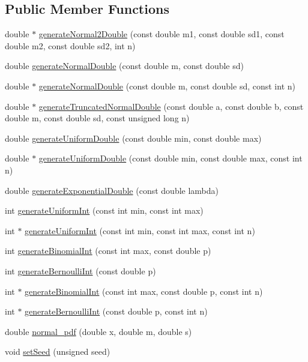 \subsection*{Public Member Functions}
\begin{DoxyCompactItemize}
\item 
double $\ast$ \mbox{\hyperlink{class_random_number_generator_a6a8cdbfdb3343a10aab18b83fc6ce0dc}{generate\+Normal2\+Double}} (const double m1, const double sd1, const double m2, const double sd2, int n)
\item 
double \mbox{\hyperlink{class_random_number_generator_a2598d9959bf595c3703c1d8e24f6e2f1}{generate\+Normal\+Double}} (const double m, const double sd)
\item 
double $\ast$ \mbox{\hyperlink{class_random_number_generator_a8a08591104b4fd1943eade351aa126c9}{generate\+Normal\+Double}} (const double m, const double sd, const int n)
\item 
double $\ast$ \mbox{\hyperlink{class_random_number_generator_a4e0cc6be3677ba52821cd4e0ae92cca9}{generate\+Truncated\+Normal\+Double}} (const double a, const double b, const double m, const double sd, const unsigned long n)
\item 
double \mbox{\hyperlink{class_random_number_generator_a0cbfb491d75d113c5bd0816576cb56ed}{generate\+Uniform\+Double}} (const double min, const double max)
\item 
double $\ast$ \mbox{\hyperlink{class_random_number_generator_a208c3dcccf6aa6a62151a98d58264d08}{generate\+Uniform\+Double}} (const double min, const double max, const int n)
\item 
double \mbox{\hyperlink{class_random_number_generator_a95d897f9265ece8d5ee18fbf2802b844}{generate\+Exponential\+Double}} (const double lambda)
\item 
int \mbox{\hyperlink{class_random_number_generator_aa2dd0dd9e4b520517cd31466c7066a0a}{generate\+Uniform\+Int}} (const int min, const int max)
\item 
int $\ast$ \mbox{\hyperlink{class_random_number_generator_a5a3645c649783d3208319a016f744c5f}{generate\+Uniform\+Int}} (const int min, const int max, const int n)
\item 
int \mbox{\hyperlink{class_random_number_generator_a417f97fb1a4362621b60107d98c3b4e7}{generate\+Binomial\+Int}} (const int max, const double p)
\item 
int \mbox{\hyperlink{class_random_number_generator_a480c13d951cbcc9dd3a3afa29145c097}{generate\+Bernoulli\+Int}} (const double p)
\item 
int $\ast$ \mbox{\hyperlink{class_random_number_generator_a5b95ab4b064f39c8bdbb14af938efc0e}{generate\+Binomial\+Int}} (const int max, const double p, const int n)
\item 
int $\ast$ \mbox{\hyperlink{class_random_number_generator_a2b52648a0de3e6da4c51a0f9b30a67f0}{generate\+Bernoulli\+Int}} (const double p, const int n)
\item 
double \mbox{\hyperlink{class_random_number_generator_a4e661a49e8dd66e13c313c99adefddb0}{normal\+\_\+pdf}} (double x, double m, double s)
\item 
void \mbox{\hyperlink{class_random_number_generator_a20e812772b0544720b32256911e372e2}{set\+Seed}} (unsigned seed)
\end{DoxyCompactItemize}
